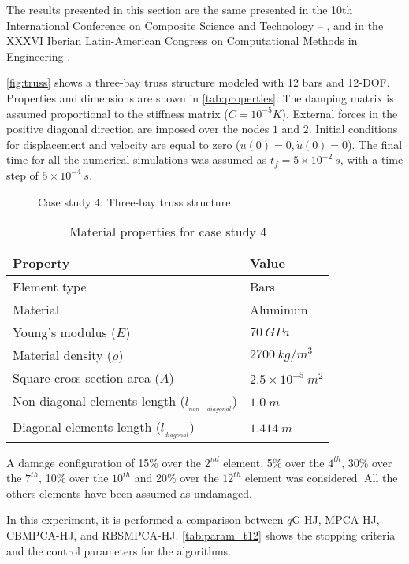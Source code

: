 The results presented in this section are the same presented in the 10th International Conference on Composite Science and Technology -- \cite{HernandezTorres2015b}, and in the XXXVI Iberian Latin-American Congress on Computational Methods in Engineering \cite{HernandezTorres2015}.

\autoref{fig:truss} shows a three-bay truss structure modeled with 12 bars and 12-DOF. Properties and dimensions are shown in \autoref{tab:properties}. The damping matrix is assumed proportional to the stiffness matrix ($C = 10^{-5}K$). External forces in the positive diagonal direction are imposed over the nodes $1$ and $2$. Initial conditions for displacement and velocity are equal to zero ($u(0) = 0, \dot u(0) = 0$). The final time for all the numerical simulations was assumed as $t_f = 5 \times 10^{-2}~s$, with a time step of $5 \times 10^{-4}~s$.

\begin{figure}[H]
\caption{Case study 4: Three-bay truss structure}
\label{fig:truss}
\centering
{}
\end{figure}

\begin{table}[H]
\centering
\footnotesize
\caption{Material properties for case study 4}
\label{tab:properties}
\begin{tabular}{ll}
\hline
Property & Value\\
\hline
Element type & Bars \\
Material & Aluminum\\
Young’s modulus ($E$) & $70~GPa$\\
Material density ($\rho$) & $2700~kg/m^3$\\
Square cross section area ($A$) & $2.5 \times 10^{-5}~m^2$ \\
Non-diagonal elements length ($l_{_{non-diagonal}}$) & $1.0~m$ \\
Diagonal elements length ($l_{_{diagonal}}$) & $1.414~m$ \\
\hline
\end{tabular}
\end{table}

A damage configuration of 15\% over the $2^{nd}$ element, 5\% over the $4^{th}$, 30\% over the $7^{th}$, 10\% over the $10^{th}$ and 20\% over the $12^{th}$ element was considered. All the others elements have been assumed as undamaged.

In this experiment, it is performed a comparison between $q$G-HJ, MPCA-HJ, CBMPCA-HJ, and RBSMPCA-HJ. \autoref{tab:param_t12} shows the stopping criteria and the control parameters for the algorithms.

